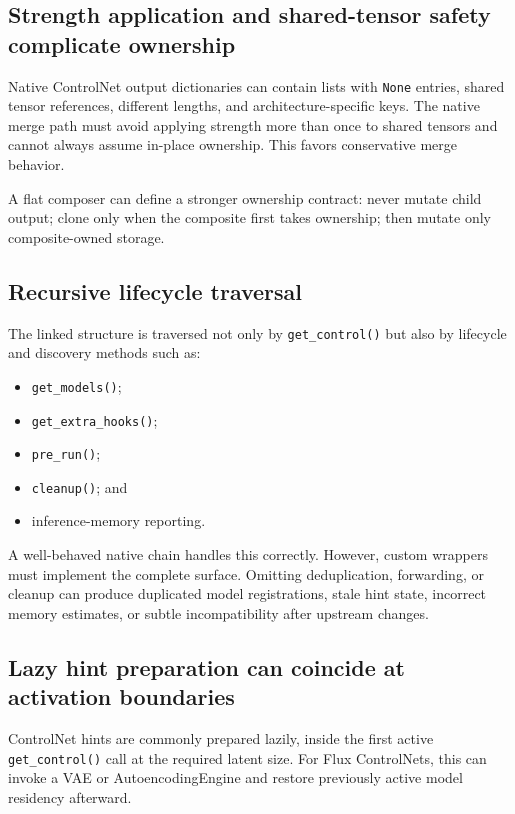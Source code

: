 \documentclass[11pt]{article}
\newcommand{\code}[1]{\texttt{#1}}
\begin{document}
\subsection{Strength application and shared-tensor safety complicate ownership}

Native ControlNet output dictionaries can contain lists with \code{None} entries, shared tensor references, different lengths, and architecture-specific keys. The native merge path must avoid applying strength more than once to shared tensors and cannot always assume in-place ownership. This favors conservative merge behavior.

A flat composer can define a stronger ownership contract: never mutate child output; clone only when the composite first takes ownership; then mutate only composite-owned storage.

\subsection{Recursive lifecycle traversal}

The linked structure is traversed not only by \code{get\_control()} but also by lifecycle and discovery methods such as:

\begin{itemize}
  \item \code{get\_models()};
  \item \code{get\_extra\_hooks()};
  \item \code{pre\_run()};
  \item \code{cleanup()}; and
  \item inference-memory reporting.
\end{itemize}

A well-behaved native chain handles this correctly. However, custom wrappers must implement the complete surface. Omitting deduplication, forwarding, or cleanup can produce duplicated model registrations, stale hint state, incorrect memory estimates, or subtle incompatibility after upstream changes.

\subsection{Lazy hint preparation can coincide at activation boundaries}

ControlNet hints are commonly prepared lazily, inside the first active \code{get\_control()} call at the required latent size. For Flux ControlNets, this can invoke a VAE or AutoencodingEngine and restore previously active model residency afterward.
\end{document}
